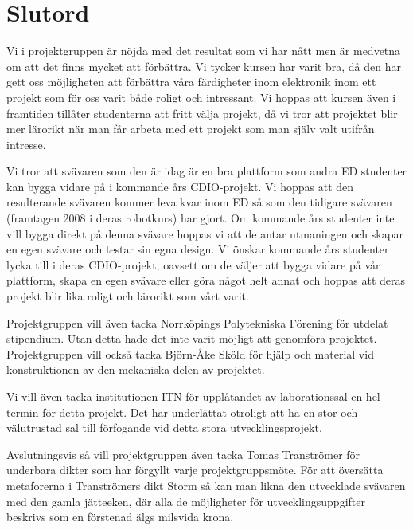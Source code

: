 \section{Slutord}
Vi i projektgruppen är nöjda med det resultat som vi har nått men är medvetna om
att det finns mycket att förbättra. Vi tycker kursen har varit bra, då den har
gett oss möjligheten att förbättra våra färdigheter inom elektronik inom ett
projekt som för oss varit både roligt och intressant. Vi hoppas att kursen även
i framtiden tillåter studenterna att fritt välja projekt, då vi tror att
projektet blir mer lärorikt när man får arbeta med ett projekt som man själv
valt utifrån intresse.

Vi tror att svävaren som den är idag är en bra plattform som andra ED studenter
kan bygga vidare på i kommande års CDIO-projekt. Vi hoppas att den resulterande
svävaren kommer leva kvar inom ED så som den tidigare svävaren (framtagen 2008 i
deras robotkurs) har gjort. Om kommande års studenter inte vill bygga direkt på
denna svävare hoppas vi att de antar utmaningen och skapar en egen svävare och
testar sin egna design. Vi önskar kommande års studenter lycka till i deras
CDIO-projekt, oavsett om de väljer att bygga vidare på vår plattform, skapa en
egen svävare eller göra något helt annat och hoppas att deras projekt blir lika
roligt och lärorikt som vårt varit.

Projektgruppen vill även tacka Norrköpings Polytekniska Förening för utdelat
stipendium. Utan detta hade det inte varit möjligt att genomföra projektet.
Projektgruppen vill också tacka Björn-Åke Sköld för hjälp och material vid
konstruktionen av den mekaniska delen av projektet.

Vi vill även tacka institutionen ITN för upplåtandet av laborationssal en hel
termin för detta projekt. Det har underlättat otroligt att ha en stor och
välutrustad sal till förfogande vid detta stora utvecklingsprojekt.

Avslutningsvis så vill projektgruppen även tacka Tomas Tranströmer för underbara
dikter som har förgyllt varje projektgruppsmöte. För att översätta metaforerna i
Tranströmers dikt Storm så kan man likna den utvecklade svävaren med den gamla
jätteeken, där alla de möjligheter för utvecklingsuppgifter beskrivs som en
förstenad älgs milsvida krona.
